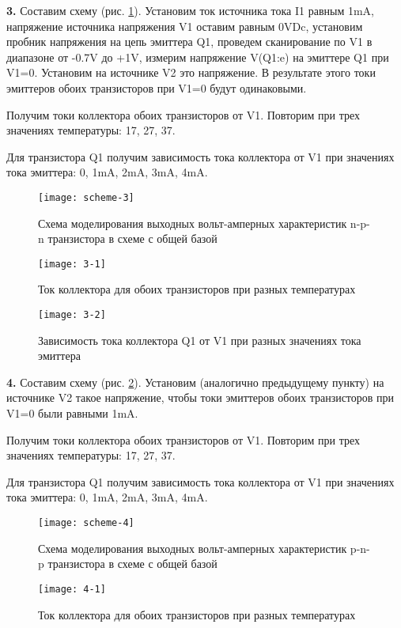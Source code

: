 \documentclass{semi}
\begin{document}
\textbf{{\normalsize 3.}}
Составим схему (рис. \ref{scheme-3}). Установим ток источника тока I1 равным 1mA, напряжение источника напряжения V1 оставим равным 0VDc, установим пробник напряжения на цепь эмиттера Q1, проведем сканирование по V1 в диапазоне от -0.7V до +1V, измерим напряжение V(Q1:e) на эмиттере Q1 при V1=0. Установим на источнике V2 это напряжение. В результате этого токи эмиттеров обоих транзисторов при V1=0 будут одинаковыми.

Получим токи коллектора обоих транзисторов от V1.
Повторим при трех значениях температуры: 17, 27, 37.

Для транзистора Q1 получим зависимость тока коллектора от V1 при значениях тока эмиттера: 0, 1mA, 2mA, 3mA, 4mA.

\begin{figure}[H]
	\centering
	\texttt{[image: scheme-3]}
	\caption{Схема моделирования выходных вольт-амперных характеристик n-p-n транзистора в схеме с общей базой}
	\label{scheme-3}
\end{figure}

\begin{figure}[H]
	\centering
	\texttt{[image: 3-1]}
	\caption{Ток коллектора для обоих транзисторов при разных температурах}
\end{figure}

\begin{figure}[H]
	\centering
	\texttt{[image: 3-2]}
	\caption{Зависимость тока коллектора Q1 от V1 при разных значениях тока эмиттера}
\end{figure}

\textbf{{\normalsize 4.}}
Составим схему (рис. \ref{scheme-4}). Установим (аналогично предыдущему пункту) на источнике V2 такое напряжение, чтобы токи эмиттеров обоих транзисторов при V1=0 были равными 1mA.

Получим токи коллектора обоих транзисторов от V1.
Повторим при трех значениях температуры: 17, 27, 37.

Для транзистора Q1 получим зависимость тока коллектора от V1 при значениях тока эмиттера: 0, 1mA, 2mA, 3mA, 4mA.

\begin{figure}[H]
	\centering
	\texttt{[image: scheme-4]}
	\caption{Схема моделирования выходных вольт-амперных характеристик p-n-p транзистора в схеме с общей базой}
	\label{scheme-4}
\end{figure}

\begin{figure}[H]
	\centering
	\texttt{[image: 4-1]}
	\caption{Ток коллектора для обоих транзисторов при разных температурах}
\end{figure}
\end{document}
